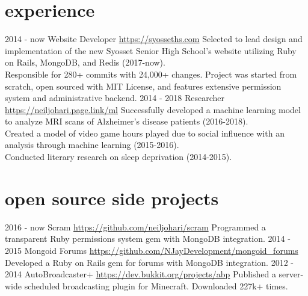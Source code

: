 \documentclass[]{friggeri-cv}
\begin{document}
\section{experience}
\begin{entrylist}
    \entry
    {2014 - now}
    {Website Developer}
    {\href{https://syosseths.com}{https://syosseths.com}}
    {Selected to lead design and implementation of the new Syosset Senior High School’s website utilizing Ruby on Rails, MongoDB, and Redis (2017-now). \\ 
    Responsible for 280+ commits with 24,000+ changes. Project was started from scratch, open sourced with MIT License, and features extensive permission system and administrative backend.}
    \entry
    {2014 - 2018}
    {Researcher}
    {\href{https://neiljohari.page.link/ml}{https://neiljohari.page.link/ml}}
    {Successfully developed a machine learning model to analyze MRI scans of Alzheimer’s disease patients (2016-2018). \\
        Created a model of video game hours played due to social influence with an analysis through machine learning (2015-2016). \\
    Conducted literary research on sleep deprivation (2014-2015).}
\end{entrylist} 

\section{open source side projects }
\begin{entrylist}
    \entry
    {2016 - now}
    {Scram}
    {\href{https://github.com/neiljohari/scram}{https://github.com/neiljohari/scram}}
    {Programmed a transparent Ruby permissions system gem with MongoDB integration.}
    \entry
    {2014 - 2015}
    {Mongoid Forums}
    {\href{https://github.com/NJayDevelopment/mongoid_forums}{https://github.com/NJayDevelopment/mongoid\_forums}}
    {Developed a Ruby on Rails gem for forums with MongoDB integration.}
    \entry
    {2012 - 2014}
    {AutoBroadcaster+}
    {\href{https://dev.bukkit.org/projects/abp}{https://dev.bukkit.org/projects/abp}}
    {Published a server-wide scheduled broadcasting plugin for Minecraft. Downloaded 227k+ times.}

\end{entrylist}
\end{document}
